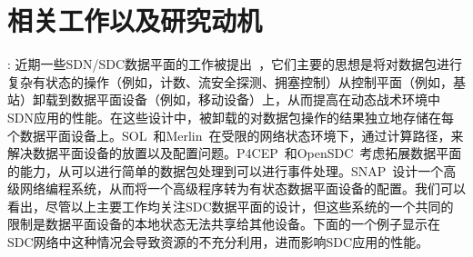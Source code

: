\section{相关工作以及研究动机}\label{sec:motivation}
:
近期一些SDN/SDC数据平面的工作被提出~\cite{arashloo2016snap, heorhiadi2016simplifying, soule2014merlin, benet2018mp, katta2016hula, gember2012stratos, anwer2015programming, monsanto2012compiler, kohler2018p4cep, bianchi2014openstate, opensdc}，它们主要的思想是将对数据包进行复杂有状态的操作（例如，计数、流安全探测、拥塞控制）从控制平面（例如，基站）卸载到数据平面设备（例如，移动设备）上，从而提高在动态战术环境中SDN应用的性能。在这些设计中，被卸载的对数据包操作的结果独立地存储在每个数据平面设备上。SOL~\cite{heorhiadi2016simplifying}和Merlin~\cite{soule2014merlin}在受限的网络状态环境下，通过计算路径，来解决数据平面设备的放置以及配置问题。P4CEP~\cite{kohler2018p4cep}和OpenSDC~\cite{opensdc}考虑拓展数据平面的能力，从可以进行简单的数据包处理到可以进行事件处理。SNAP~\cite{arashloo2016snap}设计一个高级网络编程系统，从而将一个高级程序转为有状态数据平面设备的配置。我们可以看出，尽管以上主要工作均关注SDC数据平面的设计，但这些系统的一个共同的限制是数据平面设备的本地状态无法共享给其他设备。下面的一个例子显示在SDC网络中这种情况会导致资源的不充分利用，进而影响SDC应用的性能。
 

